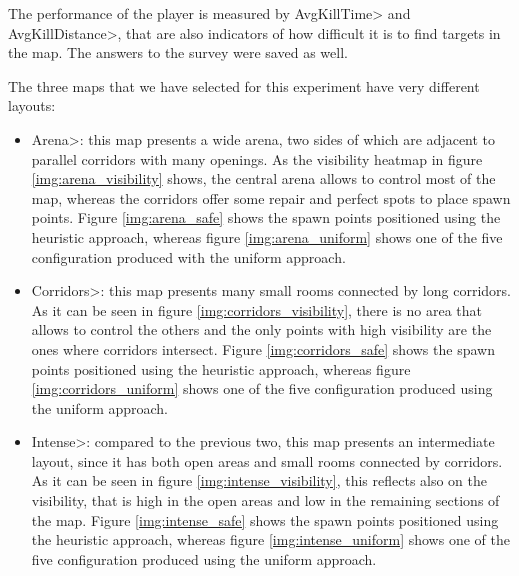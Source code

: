 \noindent
The performance of the player is measured by \<AvgKillTime> and \<AvgKillDistance>, that are also indicators of how difficult it is to find targets in the map. The answers to the survey were saved as well.

\par

The three maps that we have selected for this experiment have very different layouts:

\begin{itemize}
\item \<Arena>: this map presents a wide arena, two sides of which are adjacent to parallel corridors with many openings. As the visibility heatmap in figure \ref{img:arena_visibility} shows, the central arena allows to control most of the map, whereas the corridors offer some repair and perfect spots to place spawn points. Figure \ref{img:arena_safe} shows the spawn points positioned using the heuristic approach, whereas figure \ref{img:arena_uniform} shows one of the five configuration produced with the uniform approach.
\item \<Corridors>: this map presents many small rooms connected by long corridors. As it can be seen in figure \ref{img:corridors_visibility}, there is no area that allows to control the others and the only points with high visibility are the ones where corridors intersect. Figure \ref{img:corridors_safe} shows the spawn points positioned using the heuristic approach, whereas figure \ref{img:corridors_uniform} shows one of the five configuration produced using the uniform approach.
\item \<Intense>: compared to the previous two, this map presents an intermediate layout, since it has both open areas and small rooms connected by corridors. As it can be seen in figure \ref{img:intense_visibility}, this reflects also on the visibility, that is high in the open areas and low in the remaining sections of the map. Figure \ref{img:intense_safe} shows the spawn points positioned using the heuristic approach, whereas figure \ref{img:intense_uniform} shows one of the five configuration produced using the uniform approach.
\end{itemize}

